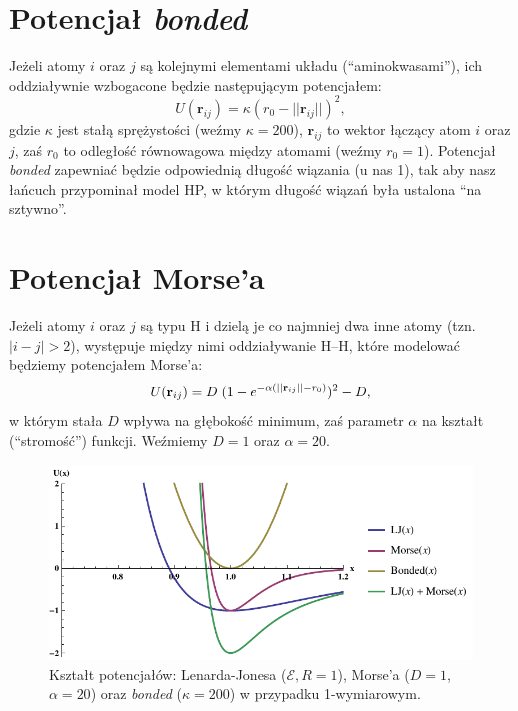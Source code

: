 \documentclass[a4paper,11pt,twoside]{book}
\begin{document}
\section{Potencjał \emph{bonded}}
\label{bonded}
Jeżeli atomy $i$ oraz $j$ są kolejnymi elementami układu (``aminokwasami''), ich oddziaływnie wzbogacone będzie następującym potencjałem:
\begin{displaymath}
U(\mathbf{r}_{ij}) =  \kappa ( r_0 - ||\mathbf{r}_{ij}|| )^2 ,
\end{displaymath}
gdzie $\kappa$ jest stałą sprężystości (weźmy $\kappa=200$), $\mathbf{r}_{ij}$ to wektor łączący atom $i$ oraz $j$, zaś $r_0$ to odległość równowagowa między atomami (weźmy $r_0 = 1$).
Potencjał \emph{bonded} zapewniać będzie odpowiednią długość wiązania (u nas 1), tak aby nasz łańcuch przypominał model HP, w którym długość wiązań była ustalona ``na sztywno''.

\section{Potencjał Morse'a}
\label{morse}
Jeżeli atomy $i$ oraz $j$ są typu H i dzielą je co najmniej dwa inne atomy (tzn. \mbox{$|i-j|>2$}), występuje między nimi oddziaływanie H--H, które modelować będziemy potencjałem Morse'a:
\begin{displaymath}
U(\mathbf{r}_{ij}) = D \hspace{0.1cm} (1 - e^{ -\alpha ( || \mathbf{r}_{ij} || - r_0) })^2 - D,
\end{displaymath}
w którym stała $D$ wpływa na głębokość minimum, zaś parametr $\alpha$ na kształt (``stromość'') funkcji.
Weźmiemy $D=1$ oraz $\alpha=20$.
\begin{figure}[h!]
\label{potencjal}
\caption[To należy zmienić]
{
Kształt potencjałów: Lenarda-Jonesa ($\mathcal{E},R=1$), Morse'a ($D=1$, $\alpha = 20$) oraz \emph{bonded} ($\kappa = 200$) w przypadku 1-wymiarowym.
}
\centering
\includegraphics[scale=0.9]{potentials}
\end{figure}
\end{document}
